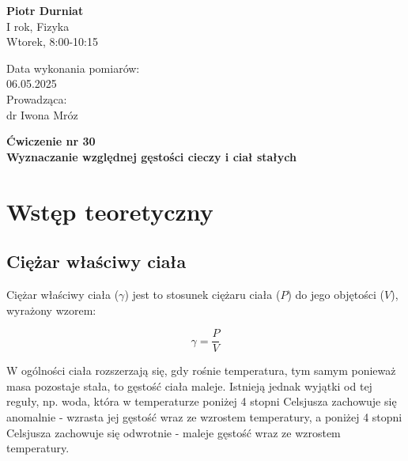 \documentclass[a4paper,12pt]{article}
\begin{document}
\noindent
\begin{minipage}{0.5\textwidth}
    \raggedright
    \textbf{Piotr Durniat} \\
    I rok, Fizyka \\
    Wtorek, 8:00-10:15 \\
    \vspace{0.5cm}
    \vspace{0.5cm}
\end{minipage}%
\begin{minipage}{0.5\textwidth}
    \raggedleft
    Data wykonania pomiarów: \\
    06.05.2025 \\
    \vspace{0.5cm} %
    Prowadząca: \\
    dr Iwona Mróz
\end{minipage}

\vspace{2cm} %
\begin{center}
    \LARGE \textbf{Ćwiczenie nr 30} \\[0.5cm]
    \Large \textbf{Wyznaczanie względnej gęstości cieczy i ciał stałych}
\end{center}

\vspace{1cm} %
\noindent

\tableofcontents
\newpage

\section{Wstęp teoretyczny}

\subsection*{Ciężar właściwy ciała}

Ciężar właściwy ciała ($\gamma$) jest to stosunek ciężaru ciała ($P$) do jego objętości ($V$), wyrażony wzorem:

\begin{equation*}
    \gamma = \frac{P}{V}
\end{equation*}


W ogólności ciała rozszerzają się, gdy rośnie temperatura, tym samym ponieważ masa pozostaje stała, to gęstość ciała maleje. Istnieją jednak wyjątki od tej reguły, np. woda, która w temperaturze poniżej 4 stopni Celsjusza zachowuje się anomalnie - wzrasta jej gęstość wraz ze wzrostem temperatury, a poniżej 4 stopni Celsjusza zachowuje się odwrotnie - maleje gęstość wraz ze wzrostem temperatury.
\end{document}
